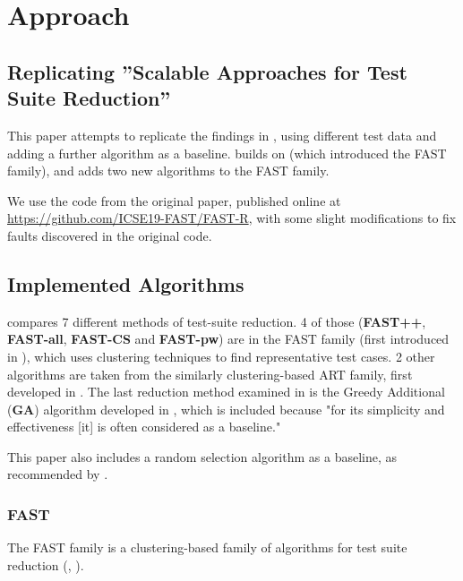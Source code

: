
\chapter{Approach}\label{chapter:approach}

\section{Replicating ''Scalable Approaches for Test Suite Reduction''}

This paper attempts to replicate the findings in
\cite{cruciani2019scalable}, using different test data and adding a
further algorithm as a baseline. \cite{cruciani2019scalable} builds on
\cite{miranda2018fast} (which introduced the FAST family), and adds two
new algorithms to the FAST family.

We use the code from the original paper, published online at
\url{https://github.com/ICSE19-FAST/FAST-R}, with some slight
modifications to fix faults discovered in the original code.

\section{Implemented Algorithms}

\cite{cruciani2019scalable} compares 7 different methods of
test-suite reduction. 4 of those (\textbf{FAST++}, \textbf{FAST-all},
\textbf{FAST-CS} and \textbf{FAST-pw}) are in the FAST family
(first introduced in \cite{miranda2018fast}), which uses clustering
techniques to find representative test cases. 2 other algorithms are
taken from the similarly clustering-based ART family, first developed
in \cite{chen2010adaptive}. The last reduction method examined in
\cite{cruciani2019scalable} is the Greedy Additional (\textbf{GA})
algorithm developed in \cite{rothermel2001prioritizing}, which is included
because "for its simplicity and effectiveness [it] is often considered
as a baseline."

This paper also includes a random selection algorithm as a baseline,
as recommended by \cite{khan2018systematic}.

\subsection{FAST}

The FAST family is a clustering-based family of algorithms for test
suite reduction (\cite{miranda2018fast}, \cite{cruciani2019scalable}).

